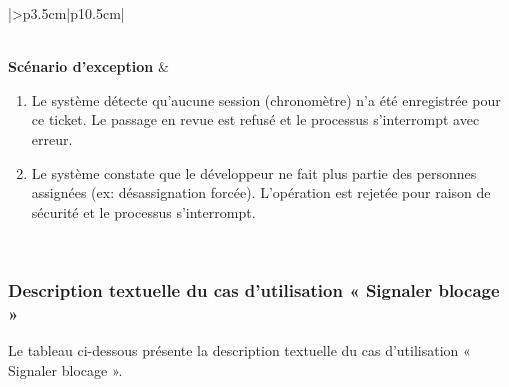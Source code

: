 \begin{longtable}{|>{}p{3.5cm}|p{10.5cm}|}
\begin{minipage}[t]{\linewidth}
\begin{enumerate}[label=A\arabic*.,nosep,leftmargin=0.6cm,topsep=0pt,itemsep=1pt]
\end{enumerate}
\end{minipage} \\
\hline
\textbf{Scénario d'exception} &
\begin{minipage}[t]{\linewidth}\raggedright
\begin{enumerate}[label=E\arabic*.,nosep,leftmargin=0.6cm,topsep=0pt,itemsep=1pt]
\item Le système détecte qu'aucune session (chronomètre) n'a été enregistrée pour ce ticket. Le passage en revue est refusé et le processus s'interrompt avec erreur.
\item Le système constate que  le développeur ne fait plus partie des personnes assignées (ex: désassignation forcée). L'opération est rejetée pour raison de sécurité et le processus s'interrompt.
\end{enumerate}
\end{minipage} \\
\hline
\end{longtable}
\normalsize


\subsubsection{Description textuelle du cas d’utilisation « Signaler blocage »}
Le tableau ci-dessous présente la description textuelle du cas d’utilisation « Signaler blocage ».

